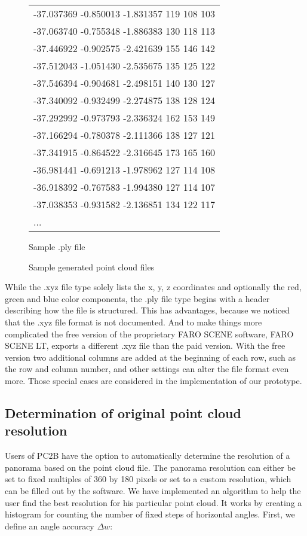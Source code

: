 \begin{figure}[h]
\begin{subtable}[b]{0.46\textwidth}
{\begin{tabular}{l}
					-37.037369 -0.850013 -1.831357 119 108 103 \\
					-37.063740 -0.755348 -1.886383 130 118 113 \\
					-37.446922 -0.902575 -2.421639 155 146 142 \\
					-37.512043 -1.051430 -2.535675 135 125 122 \\
					-37.546394 -0.904681 -2.498151 140 130 127 \\
					-37.340092 -0.932499 -2.274875 138 128 124 \\
					-37.292992 -0.973793 -2.336324 162 153 149 \\
					-37.166294 -0.780378 -2.111366 138 127 121 \\
					-37.341915 -0.864522 -2.316645 173 165 160 \\
					-36.981441 -0.691213 -1.978962 127 114 108 \\
					-36.918392 -0.767583 -1.994380 127 114 107 \\
					-37.038353 -0.931582 -2.136851 134 122 117 \\
					...
					
				\end{tabular}}
				\caption{Sample .ply file}
				\label{tab:ply_file}
			\end{subtable}
			\caption{Sample generated point cloud files}
			\label{fig:xyz_ply_file_structure}
\end{figure}

While the .xyz file type solely lists the x, y, z coordinates and optionally the red, green and blue color components, the .ply file type begins with a header describing how the file is structured. This has advantages, because we noticed that the .xyz file format is not documented. And to make things more complicated the free version of the proprietary FARO SCENE software, FARO SCENE LT, exports a different .xyz file than the paid version. With the free version two additional columns are added at the beginning of each row, such as the row and column number, and other settings can alter the file format even more. Those special cases are considered in the implementation of our prototype.


\subsection{Determination of original point cloud resolution}

Users of PC2B have the option to automatically determine the resolution of a panorama based on the point cloud file. The panorama resolution can either be set to fixed multiples of 360 by 180 pixels or set to a custom resolution, which can be filled out by the software. We have implemented an algorithm to help the user find the best resolution for his particular point cloud. It works by creating a histogram for counting the number of fixed steps of horizontal angles. First, we define an angle accuracy $\Delta{w}$:

